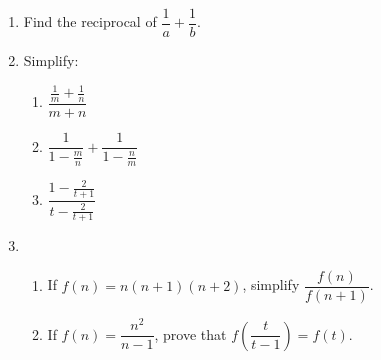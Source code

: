 \documentclass[11pt,a4paper,twoside]{article}
\begin{document}
\begin{enumerate}
\begin{enumerate}
        \end{enumerate}
\item   Find the reciprocal of $\dfrac{1}{a} + \dfrac{1}{b}$.
\newpage
\item   Simplify:
        \begin{multicols}{3}
        \begin{enumerate}
        \item	$\dfrac{\frac{1}{m} + \frac{1}{n}}{m + n}$
        \item	$\dfrac{1}{1 - \frac{m}{n}} + \dfrac{1}{1 - \frac{n}{m}}$
        \item	$\dfrac{1 - \frac{2}{t+  1}}{t - \frac{2}{t + 1}}$
        \end{enumerate}
        \end{multicols}
\item   \begin{enumerate}
        \item   If $f(n) = n(n + 1)(n + 2)$, simplify $\dfrac{f(n)}{f(n + 1)}$.
        \item   If $f(n) = \dfrac{n^2}{n - 1}$, prove that $f\left(\dfrac{t}{t - 1}\right) = f(t)$.
        \end{enumerate}
\end{enumerate}
\end{document}
